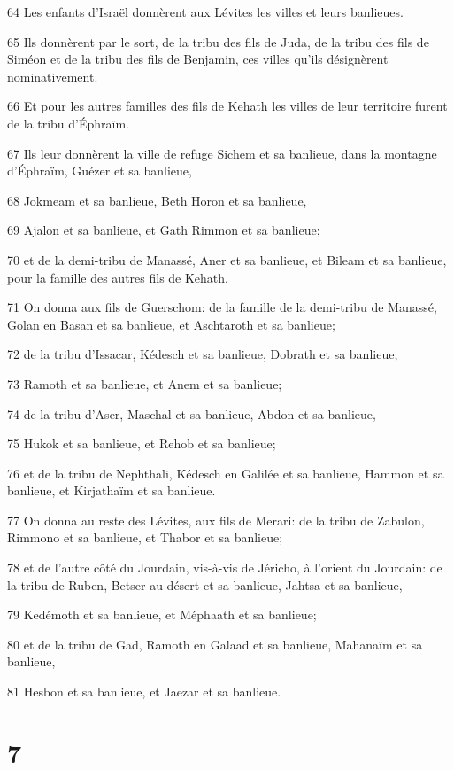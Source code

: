 \par 64 Les enfants d'Israël donnèrent aux Lévites les villes et leurs banlieues.
\par 65 Ils donnèrent par le sort, de la tribu des fils de Juda, de la tribu des fils de Siméon et de la tribu des fils de Benjamin, ces villes qu'ils désignèrent nominativement.
\par 66 Et pour les autres familles des fils de Kehath les villes de leur territoire furent de la tribu d'Éphraïm.
\par 67 Ils leur donnèrent la ville de refuge Sichem et sa banlieue, dans la montagne d'Éphraïm, Guézer et sa banlieue,
\par 68 Jokmeam et sa banlieue, Beth Horon et sa banlieue,
\par 69 Ajalon et sa banlieue, et Gath Rimmon et sa banlieue;
\par 70 et de la demi-tribu de Manassé, Aner et sa banlieue, et Bileam et sa banlieue, pour la famille des autres fils de Kehath.
\par 71 On donna aux fils de Guerschom: de la famille de la demi-tribu de Manassé, Golan en Basan et sa banlieue, et Aschtaroth et sa banlieue;
\par 72 de la tribu d'Issacar, Kédesch et sa banlieue, Dobrath et sa banlieue,
\par 73 Ramoth et sa banlieue, et Anem et sa banlieue;
\par 74 de la tribu d'Aser, Maschal et sa banlieue, Abdon et sa banlieue,
\par 75 Hukok et sa banlieue, et Rehob et sa banlieue;
\par 76 et de la tribu de Nephthali, Kédesch en Galilée et sa banlieue, Hammon et sa banlieue, et Kirjathaïm et sa banlieue.
\par 77 On donna au reste des Lévites, aux fils de Merari: de la tribu de Zabulon, Rimmono et sa banlieue, et Thabor et sa banlieue;
\par 78 et de l'autre côté du Jourdain, vis-à-vis de Jéricho, à l'orient du Jourdain: de la tribu de Ruben, Betser au désert et sa banlieue, Jahtsa et sa banlieue,
\par 79 Kedémoth et sa banlieue, et Méphaath et sa banlieue;
\par 80 et de la tribu de Gad, Ramoth en Galaad et sa banlieue, Mahanaïm et sa banlieue,
\par 81 Hesbon et sa banlieue, et Jaezar et sa banlieue.

\chapter{7}

